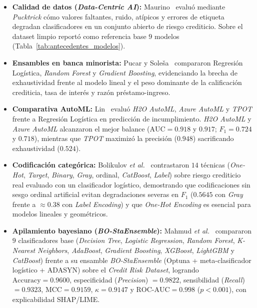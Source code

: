 \documentclass[conference]{IEEEtran}
\begin{document}
\begin{itemize}
\item \textbf{Calidad de datos (\textit{Data-Centric AI}):} Maurino~\cite{maurino2025dataquality} evaluó mediante \textit{Pucktrick} cómo valores faltantes, ruido, atípicos y errores de etiqueta degradan clasificadores en un conjunto abierto de riesgo crediticio. Sobre el dataset limpio reportó como referencia base $9$ modelos (Tabla~\ref{tab:antecedentes_modelos}).
\item \textbf{Ensambles en banca minorista:} Pucar y Soleša~\cite{pucar2026consumer} compararon Regresión Logística, \textit{Random Forest} y \textit{Gradient Boosting}, evidenciando la brecha de exhaustividad frente al modelo lineal y el peso dominante de la calificación crediticia, tasa de interés y razón préstamo-ingreso.
\item \textbf{Comparativa AutoML:} Lin~\cite{lin2026automl} evaluó \textit{H2O AutoML}, \textit{Azure AutoML} y \textit{TPOT} frente a Regresión Logística en predicción de incumplimiento. \textit{H2O AutoML} y \textit{Azure AutoML} alcanzaron el mejor balance ($\text{AUC}=0.918$ y $0.917$; $F_1=0.724$ y $0.718$), mientras que \textit{TPOT} maximizó la precisión ($0.948$) sacrificando exhaustividad ($0.524$).
\item \textbf{Codificación categórica:} Bolikulov \textit{et al.}~\cite{bolikulov2024categorical} contrastaron $14$ técnicas (\textit{One-Hot}, \textit{Target}, \textit{Binary}, \textit{Gray}, ordinal, \textit{CatBoost}, \textit{Label}) sobre riesgo crediticio real evaluado con un clasificador logístico, demostrando que codificaciones sin sesgo ordinal artificial evitan degradaciones severas en $F_1$ ($0.5645$ con \textit{Gray} frente a $\approx 0.38$ con \textit{Label Encoding}) y que \textit{One-Hot Encoding} es esencial para modelos lineales y geométricos.
\item \textbf{Apilamiento bayesiano (\textit{BO-StaEnsemble}):} Mahmud \textit{et al.}~\cite{mahmud2025stacking} compararon $9$ clasificadores base (\textit{Decision Tree}, \textit{Logistic Regression}, \textit{Random Forest}, \textit{K-Nearest Neighbors}, \textit{AdaBoost}, \textit{Gradient Boosting}, \textit{XGBoost}, \textit{LightGBM} y \textit{CatBoost}) frente a su ensamble \textit{BO-StaEnsemble} (Optuna + meta-clasificador logístico + ADASYN) sobre el \textit{Credit Risk Dataset}, logrando $\text{Accuracy}=0.9600$, especificidad (\textit{Precision}) $=0.9822$, sensibilidad (\textit{Recall}) $=0.9323$, $\text{MCC}=0.9159$, $\kappa=0.9147$ y $\text{ROC-AUC}=0.998$ ($p < 0.001$), con explicabilidad SHAP/LIME.
\end{itemize}
\end{document}

